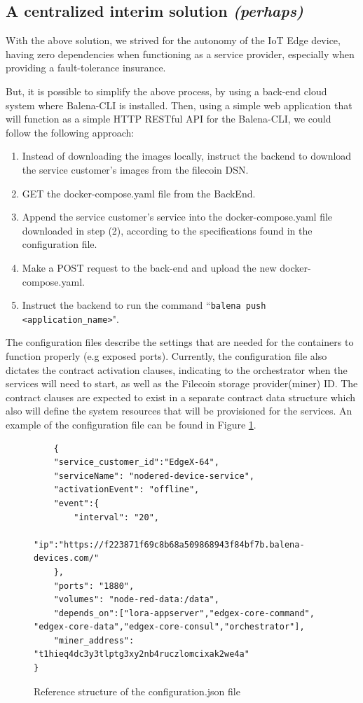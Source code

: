 \subsection{A centralized interim solution \textit{(perhaps)}}

With the above solution, we strived for the autonomy of the IoT Edge device, having zero dependencies when functioning as a service provider, especially when providing a fault-tolerance insurance.

But, it is possible to simplify the above process, by using a back-end cloud system where Balena-CLI is installed. Then, using a simple web application that will function as a simple HTTP RESTful API for the Balena-CLI, we could follow the following approach:

\begin{enumerate}
    \item Instead of downloading the images locally, instruct the backend to download the service customer’s images from the filecoin DSN.
    \item GET the docker-compose.yaml file from the BackEnd.
    \item Append the service customer’s service into the docker-compose.yaml file downloaded in step (2), according to the specifications found in the configuration file.
    \item Make a POST request to the back-end and upload the new docker-compose.yaml.
    \item Instruct the backend to run the command “\texttt{balena push <application\_name>}".
\end{enumerate}

The configuration files describe the settings that are needed for the containers to function properly (e.g exposed ports). Currently,  the configuration file also dictates the contract activation clauses, indicating to the orchestrator when the services will need to start, as well as the Filecoin storage provider(miner) ID. The contract clauses are expected to exist in a separate contract data structure which also will define the system resources that will be provisioned for the services. An example of the configuration file can be found in Figure \ref{fig:configuration-file}.

\begin{figure}
\centering
\begin{verbatim}
    {
    "service_customer_id":"EdgeX-64",
    "serviceName": "nodered-device-service",
    "activationEvent": "offline",
    "event":{
        "interval": "20",
        "ip":"https://f223871f69c8b68a509868943f84bf7b.balena-devices.com/"
    },
    "ports": "1880",
    "volumes": "node-red-data:/data",
    "depends_on":["lora-appserver","edgex-core-command", "edgex-core-data","edgex-core-consul","orchestrator"],
    "miner_address": "t1hieq4dc3y3tlptg3xy2nb4ruczlomcixak2we4a"
}
\end{verbatim}
\caption{Reference structure of the configuration.json file}
\label{fig:configuration-file}
\end{figure}

